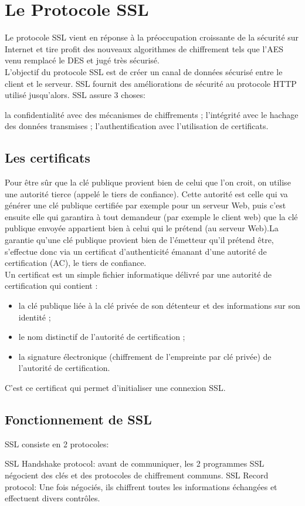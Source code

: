 \section{Le Protocole SSL}
Le protocole SSL vient en réponse à la préoccupation croissante de la sécurité sur Internet et tire profit des nouveaux algorithmes de chiffrement tels que l’AES venu remplacé le DES et jugé très sécurisé. \\
L’objectif du protocole SSL est de créer un canal de données sécurisé entre le client et le serveur. SSL fournit des améliorations de sécurité au protocole HTTP utilisé jusqu'alors. 
SSL assure 3 choses:
\begin{itemize}
	\itemcheck la confidentialité avec des mécanismes de chiffrements ;
	\itemcheck l’intégrité avec le hachage des données transmises ;
	\itemcheck l’authentification avec l’utilisation de certificats.
\end{itemize}
\subsection{Les certificats}
Pour être sûr que la clé publique provient bien de celui que l'on croit, on utilise une autorité tierce (appelé le tiers de confiance). Cette autorité est celle qui va générer une clé publique certifiée par exemple pour un serveur Web, puis c'est ensuite elle qui garantira à tout demandeur (par exemple le client web) que la clé publique envoyée appartient bien à celui qui le prétend (au serveur Web).La garantie qu'une clé publique provient bien de l'émetteur qu'il prétend être, s'effectue donc via un certificat d'authenticité émanant d'une autorité de certification (AC), le tiers de confiance.\\
Un certificat est un simple fichier informatique délivré par une autorité de certification qui contient :
\begin{itemize}
	 \item la clé publique liée à la clé privée de son détenteur et des informations sur son identité ;
	 \item le nom distinctif de l'autorité de certification ;
	 \item la signature électronique (chiffrement de l'empreinte par clé privée) de l'autorité de certification.
\end{itemize}
C’est ce certificat qui permet d’initialiser une connexion SSL.
\subsection{Fonctionnement de SSL}
SSL consiste en 2 protocoles:
\begin{itemize}
	\itemcheck SSL Handshake protocol: avant de communiquer, les 2 programmes SSL négocient des clés et des protocoles de chiffrement communs.
	\itemcheck SSL Record protocol: Une fois négociés, ils chiffrent toutes les informations échangées et effectuent divers contrôles.
\end{itemize}

